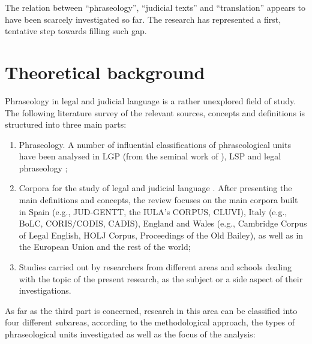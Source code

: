 \documentclass[output=paper]{LSP/langsci}
\begin{document}
The relation between “phraseology”, “judicial texts” and “translation” appears to have been scarcely investigated so far. The research has represented a first, tentative step towards filling such gap.

\section{Theoretical background}
Phraseology in legal and judicial language is a rather unexplored field of study. The following literature survey of the relevant sources, concepts and definitions is structured into three main parts:

\begin{enumerate}
\item Phraseology. A number of influential classifications of phraseological units have been analysed in LGP (from the seminal work of \citealt{Benson1986,Corpas1996,Gläser1994/1995,Glaeser1998,Ruiz1997,Cowie1988,Cowie2001,Melchuk1998, Moon1998,Burger1998,Granger2008}), LSP  \citep{Homme2000,Lorente2001,Tercedor1999,Montero2002,Bevilacqua2004,Aguado2007} and legal phraseology \citep {Kjær1990,Kjaer1990b};
\item Corpora for the study of legal and judicial language \citep[see][]{Pontrandolfo2012}. After presenting the main definitions and concepts, the review focuses on the main corpora built in Spain (e.g., JUD-GENTT, the IULA’s CORPUS, CLUVI), Italy (e.g., BoLC, CORIS/CODIS, CADIS), England and Wales (e.g., Cambridge Corpus of Legal English, HOLJ Corpus, Proceedings of the Old Bailey), as well as in the European Union and the rest of the world;
\item Studies carried out by researchers from different areas and schools dealing with the topic of the present research, as the subject or a side aspect of their investigations.
\end{enumerate}

As far as the third part is concerned, research in this area can be classified into four different subareas, according to the methodological approach, the types of phraseological units investigated as well as the focus of the analysis:
\end{document}
